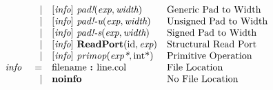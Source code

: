 \documentclass[12pt]{article}
\begin{document}
\[
\begin{array}{rrll}
                &\vert &[\text{\em info}]\  \text{\em pad!}(\text{\em exp}, \text{\em width})                                      &\text{Generic Pad to Width}\\
                &\vert &[\text{\em info}]\  \text{\em pad!-u}(\text{\em exp}, \text{\em width})                                    &\text{Unsigned Pad to Width}\\
                &\vert &[\text{\em info}]\  \text{\em pad!-s}(\text{\em exp}, \text{\em width})                                    &\text{Signed Pad to Width}\\
                &\vert &[\text{\em info}]\  \text{\bf ReadPort}(\text{id}, \text{\em exp})                                         &\text{Structural Read Port}\\
                &\vert &[\text{\em info}]\  \text{\em primop}(\text{\em exp*}, \text{int}\text{*})                                 &\text{Primitive Operation}\\
\text{\em info\ }       &=     &\text{filename } \text{\bf :\ } \text{line} . \text{col}                              &\text{File Location}\\
                &\vert &\text{\bf noinfo\ }                                                                   &\text{No File Location}\\
\end{array}
\]
\end{document}
